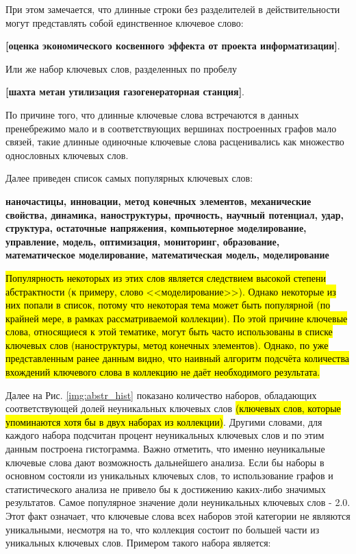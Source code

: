 При этом замечается, что длинные строки без разделителей в действительности могут представлять собой единственное ключевое слово:

\textbf{[оценка экономического косвенного эффекта от проекта информатизации]}.\

Или же набор ключевых слов, разделенных по пробелу

\textbf{[шахта метан утилизация газогенераторная станция]}.\

По причине того, что длинные ключевые слова встречаются в данных пренебрежимо мало и в соответствующих вершинах построенных графов мало связей, такие длинные одиночные ключевые слова расценивались как множество однословных ключевых слов.

Далее приведен список самых популярных ключевых слов:

\textbf{наночастицы, инновации, метод конечных элементов, механические свойства, динамика, наноструктуры, прочность, научный потенциал, удар, структура, остаточные напряжения, компьютерное моделирование, управление, модель, оптимизация, мониторинг, образование, математическое моделирование, математическая модель, моделирование}

\hl{Популярность некоторых из этих слов является следствием высокой степени абстрактности (к примеру, слово <<моделирование>>). Однако некоторые из них попали в список, потому что некоторая тема может быть популярной (по крайней мере, в рамках рассматриваемой коллекции). По этой причине ключевые слова, относящиеся к этой тематике, могут быть часто использованы в списке ключевых слов (наноструктуры, метод конечных элементов). Однако, по уже представленным ранее данным видно, что наивный алгоритм подсчёта количества вхождений ключевого слова в коллекцию не даёт необходимого результата.}

Далее на Рис. \ref{img:abstr_hist} показано количество наборов, обладающих соответствующей долей неуникальных ключевых слов \hl{(ключевых слов, которые упоминаются хотя бы в двух наборах из коллекции)}. Другими словами, для каждого набора подсчитан процент неуникальных ключевых слов и по этим данным построена гистограмма. Важно отметить, что именно неуникальные ключевые слова дают возможность дальнейшего анализа. Если бы наборы в основном состояли из уникальных ключевых слов, то использование графов и статистического анализа не привело бы к достижению каких-либо значимых результатов. Самое популярное значение доли неуникальных ключевых слов - 2.0. Этот факт означает, что ключевые слова всех наборов этой категории не являются уникальными, несмотря на то, что коллекция состоит по большей части из уникальных ключевых слов. Примером такого набора является:

